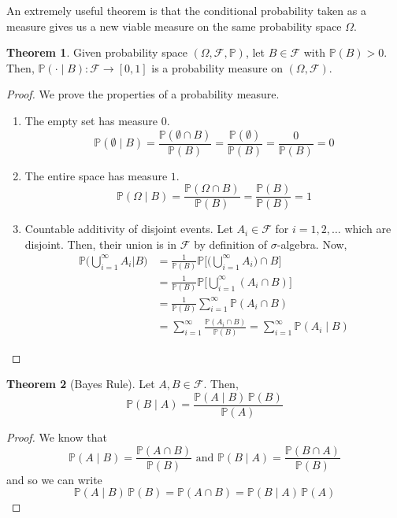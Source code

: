 \documentclass{article}
\theoremstyle{definition}
\newtheorem{theorem}{Theorem}[section]
\theoremstyle{remark}
\theoremstyle{definition}
\begin{document}
An extremely useful theorem is that the conditional probability taken as a measure gives us a new viable measure on the same probability space $\Omega$. 

\begin{theorem}
Given probability space $(\Omega, \mathcal{F}, \mathbb{P})$, let $B \in \mathcal{F}$ with $\mathbb{P}(B) > 0$. Then, $\mathbb{P}( \cdot \mid B): \mathcal{F} \longrightarrow [0, 1]$ is a probability measure on $(\Omega, \mathcal{F})$. 
\end{theorem}
\begin{proof}
We prove the properties of a probability measure. 
\begin{enumerate}
    \item The empty set has measure $0$. 
    \[\mathbb{P}(\emptyset \mid B) = \frac{\mathbb{P}( \emptyset \cap B)}{\mathbb{P}(B)} = \frac{\mathbb{P}(\emptyset)}{\mathbb{P}(B)} = \frac{0}{\mathbb{P}(B)} = 0\]
    \item The entire space has measure $1$. 
    \[\mathbb{P}(\Omega \mid B) =  \frac{\mathbb{P}( \Omega \cap B)}{\mathbb{P}(B)} = \frac{\mathbb{P}(B)}{\mathbb{P}(B)} = 1\]
    \item Countable additivity of disjoint events. Let $A_i \in \mathcal{F}$ for $i = 1, 2, \ldots$ which are disjoint. Then, their union is in $\mathcal{F}$ by definition of $\sigma$-algebra. Now, 
    \begin{align*}
        \mathbb{P}\bigg( \bigcup_{i=1}^\infty A_i \bigg| B \bigg) & = \frac{1}{\mathbb{P}(B)} \mathbb{P} \bigg[ \Big( \bigcup_{i=1}^\infty A_i \Big) \cap B \bigg] \\
        & = \frac{1}{\mathbb{P}(B)} \mathbb{P} \bigg[ \bigcup_{i=1}^\infty (A_i \cap B) \bigg] \\
        & = \frac{1}{\mathbb{P}(B)} \sum_{i=1}^\infty \mathbb{P} (A_i \cap B) \\
        & = \sum_{i=1}^\infty \frac{\mathbb{P} (A_i \cap B)}{\mathbb{P}(B)} = \sum_{i=1}^\infty \mathbb{P}(A_i \mid B) 
    \end{align*}
\end{enumerate}
\end{proof}

\begin{theorem}[Bayes Rule]
Let $A, B \in \mathcal{F}$. Then, 
\[\mathbb{P}(B \mid A) = \frac{\mathbb{P}(A \mid B) \, \mathbb{P}(B)}{\mathbb{P}(A)}\]
\end{theorem}
\begin{proof}
We know that 
\[\mathbb{P}(A \mid B) = \frac{\mathbb{P} (A \cap B)}{\mathbb{P}(B)} \text{ and } \mathbb{P}(B \mid A) = \frac{\mathbb{P}(B \cap A)}{\mathbb{P}(B)}\]
and so we can write 
\[\mathbb{P} (A \mid B) \, \mathbb{P}(B) = \mathbb{P}(A \cap B) = \mathbb{P}(B \mid A) \, \mathbb{P}(A)\]
\end{proof}
\end{document}
